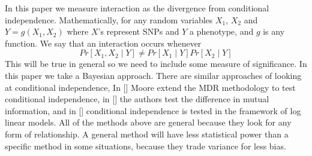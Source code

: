 \documentclass{bioinfo}
\begin{document}
In this paper we measure interaction as the divergence from conditional independence. Mathematically, for any random variables $X_1$, $X_2$ and $Y = g(X_1, X_2)$ where $X$'s represent SNPs and $Y$ a phenotype, and $g$ is any function. We say that an interaction occurs whenever
$$ Pr[ X_1, X_2 \mid Y ] \neq Pr[ X_1 \mid Y ] Pr[ X_2 \mid Y ] $$
This will be true in general so we need to include some measure of significance. In this paper we take a Bayesian approach. There are similar approaches of looking at conditional independence, In [] Moore extend the MDR methodology to test conditional independence, in [] the authors test the difference in mutual information, and in [] conditional independence is tested in the framework of log linear models. All of the methods above are general because they look for any form of relationship. A general method will have less statistical power than a specific method in some situations, because they trade variance for less bias.
\end{document}
